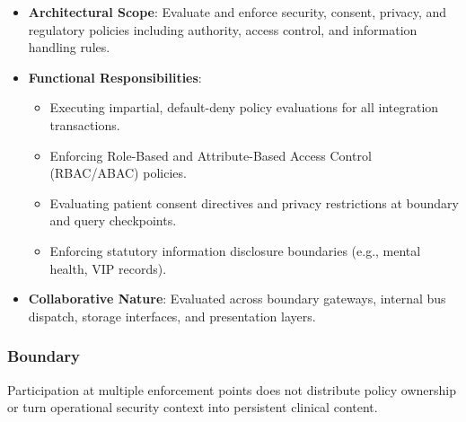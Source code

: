 \begin{itemize}

\item
\textbf{Architectural Scope}: Evaluate and enforce security, consent, privacy, and regulatory policies including authority, access control, and information handling rules.



\item
\textbf{Functional Responsibilities}:


\begin{itemize}

\item
Executing impartial, default-deny policy evaluations for all integration transactions.



\item
Enforcing Role-Based and Attribute-Based Access Control (RBAC/\allowbreak{}ABAC) policies.



\item
Evaluating patient consent directives and privacy restrictions at boundary and query checkpoints.



\item
Enforcing statutory information disclosure boundaries (e.g., mental health, VIP records).



\end{itemize}


\item
\textbf{Collaborative Nature}: Evaluated across boundary gateways, internal bus dispatch, storage interfaces, and presentation layers.



\end{itemize}
\subsubsection*{Boundary}

Participation at multiple enforcement points does not distribute policy ownership or turn operational security context into persistent clinical content.

